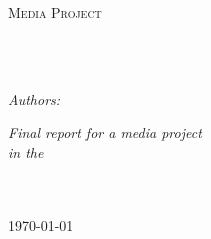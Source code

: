 \documentclass[
11pt, %
english, %
singlespacing, %
headsepline, %
]{mediaproject} %
\author{Christon Ragavan Nadar and Shivam Sani} %
\begin{document}
\frontmatter %

\pagestyle{plain} %


\begin{titlepage}
\begin{center}

\vspace*{.06\textheight}
{\scshape\LARGE \univname\par}\vspace{1.5cm} %
\textsc{\Large Media Project}\\[0.5cm] %

\HRule \\[0.4cm] %
{\huge \bfseries \ttitle\par}\vspace{0.4cm}  %
\HRule \\[1.5cm] %
 


\begin{minipage}[t]{\textwidth}
        \centering
        \emph{Authors:}\\
        \href{http://www.christonragavan.com}{\authorname} %

\end{minipage}


\vspace*{.06\textheight}


\large \textit{Final report for a media project}\\[0.3cm] %
\textit{in the}\\[0.4cm]
\groupname\\\deptname\\[2cm] %
 
\vfill

{\large \today}\\[4cm] %
 

\end{center}
\end{titlepage}
\end{document}
